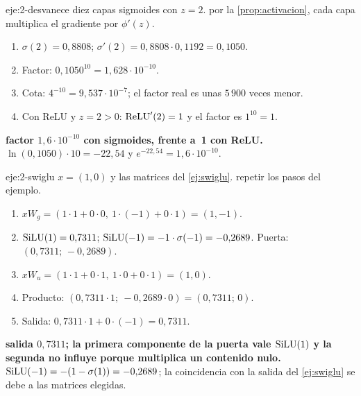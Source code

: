 \begin{solucion}{eje:2-desvanece}
\datos diez capas sigmoides con $z=2$.
\planteamiento por la \cref{prop:activacion}, cada capa multiplica el gradiente por $\phi'(z)$.
\pasos
\begin{enumerate}[label=\arabic*.]
  \item $\sigma(2)=0{,}8808$; $\sigma'(2)=0{,}8808\cdot 0{,}1192=0{,}1050$.
  \item Factor: $0{,}1050^{10}=1{,}628\cdot 10^{-10}$.
  \item Cota: $4^{-10}=9{,}537\cdot 10^{-7}$; el factor real es unas $5\,900$ veces menor.
  \item Con ReLU y $z=2>0$: $\operatorname{ReLU}'(2)=1$ y el factor es $1^{10}=1$.
\end{enumerate}
\resultado \textbf{factor $1{,}6\cdot 10^{-10}$ con sigmoides, frente a~1 con ReLU.}
\comprobacion $\ln(0{,}1050)\cdot 10=-22{,}54$ y $e^{-22{,}54}=1{,}6\cdot 10^{-10}$.
\end{solucion}

\begin{solucion}{eje:2-swiglu}
\datos $x=(1,0)$ y las matrices del \cref{ej:swiglu}.
\planteamiento repetir los pasos del ejemplo.
\pasos
\begin{enumerate}[label=\arabic*.]
  \item $xW_g=(1\cdot 1+0\cdot 0,\ 1\cdot(-1)+0\cdot 1)=(1,-1)$.
  \item $\operatorname{SiLU}(1)=0{,}7311$; $\operatorname{SiLU}(-1)=-1\cdot\sigma(-1)=-0{,}2689$. Puerta: $(0{,}7311;\,-0{,}2689)$.
  \item $xW_u=(1\cdot 1+0\cdot 1,\ 1\cdot 0+0\cdot 1)=(1,0)$.
  \item Producto: $(0{,}7311\cdot 1;\ -0{,}2689\cdot 0)=(0{,}7311;\,0)$.
  \item Salida: $0{,}7311\cdot 1+0\cdot(-1)=0{,}7311$.
\end{enumerate}
\resultado \textbf{salida $0{,}7311$; la primera componente de la puerta vale $\operatorname{SiLU}(1)$ y la segunda no influye porque multiplica un contenido nulo.}
\comprobacion $\operatorname{SiLU}(-1)=-(1-\sigma(1))=-0{,}2689$; la coincidencia con la salida del \cref{ej:swiglu} se debe a las matrices elegidas.
\end{solucion}

